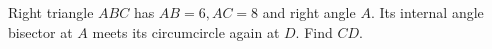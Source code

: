 Right triangle $ABC$ has $AB=6,AC=8$ and right angle $A$. Its internal angle bisector at $A$ meets its circumcircle again at $D$. Find $CD$.
